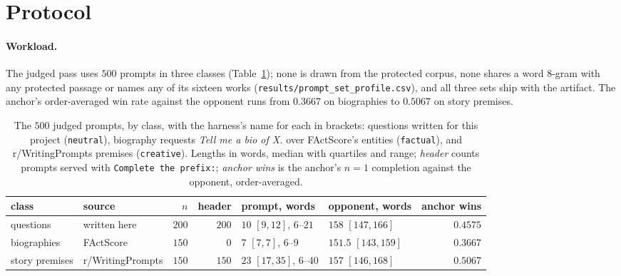 
\section{Protocol}\label{app:protocol}\label{app:sel-protocol}

\paragraph{Workload.}\label{app:promptset}
The judged pass uses $500$ prompts in three classes (Table~\ref{tab:promptset}); none is drawn from the
protected corpus, none shares a word $8$-gram with any protected passage or names any of its sixteen works
(\texttt{results/\allowbreak prompt\_\allowbreak set\_\allowbreak profile.csv}), and all three sets ship
with the artifact. The anchor's order-averaged win rate against the opponent runs from $0.3667$ on
biographies to $0.5067$ on story premises.

\begin{table}[ht]
\centering\footnotesize
\caption{The $500$ judged prompts, by class, with the harness's name for each in brackets: questions written
for this project (\texttt{neutral}), biography requests \emph{Tell me a bio of X.} over FActScore's entities
\citep{min2023factscore} (\texttt{factual}), and r/WritingPrompts premises \citep{fan2018writingprompts}
(\texttt{creative}). Lengths in words, median with quartiles and range; \emph{header} counts prompts served
with \texttt{Complete the prefix:}; \emph{anchor wins} is the anchor's $n=1$ completion against the
opponent, order-averaged.}
\label{tab:promptset}
\setlength{\tabcolsep}{4pt}
\begin{tabular}{@{}llrrllr@{}}
\toprule
class & source & $n$ & header & prompt, words & opponent, words & anchor wins \\
\midrule
questions & written here & $200$ & $200$ & $10$ $[9, 12]$, $6$--$21$ & $158$ $[147, 166]$ & $0.4575$ \\
biographies & FActScore & $150$ & $0$ & $7$ $[7, 7]$, $6$--$9$ & $151.5$ $[143, 159]$ & $0.3667$ \\
story premises & r/WritingPrompts & $150$ & $150$ & $23$ $[17, 35]$, $6$--$40$ & $157$ $[146, 168]$ & $0.5067$ \\
\bottomrule
\end{tabular}
\end{table}

